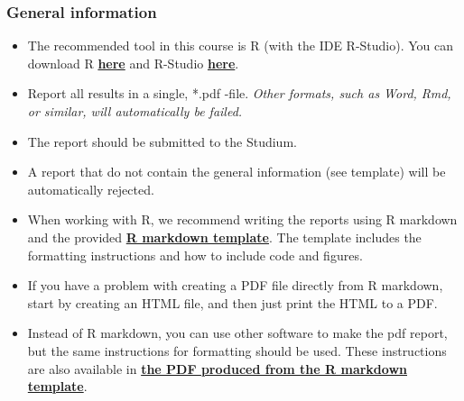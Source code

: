 
\subsubsection*{General information}


\begin{itemize}
\itemsep0em
\item The recommended tool in this course is R (with the IDE R-Studio). You can download R \href{https://cran.r-project.org/}{\textbf{here}} and R-Studio \href{https://www.rstudio.com/products/rstudio/download/}{\textbf{here}}.

\item  Report all results in a single, *.pdf -file. \emph{Other formats, such as Word, Rmd, or similar, will automatically be failed.}

\item The report should be submitted to the Studium.

\item A report that do not contain the general information (see template) will be automatically rejected.

\item When working with R, we recommend writing the reports using R markdown and the provided \href{https://raw.githubusercontent.com/MansMeg/IntroML/master/templates/assignment_template.rmd}{\textbf{R markdown template}}. The template includes the formatting instructions and how to include code and figures.

\item If you have a problem with creating a PDF file directly from R markdown, start by creating an HTML file, and then just print the HTML to a PDF.

\item Instead of R markdown, you can use other software to make the pdf report, but the same instructions for formatting should be used. These instructions are also available in \href{https://raw.githubusercontent.com/MansMeg/IntroML/master/templates/assignment_template.pdf}{\textbf{the PDF produced from the R markdown template}}.



\end{itemize}

